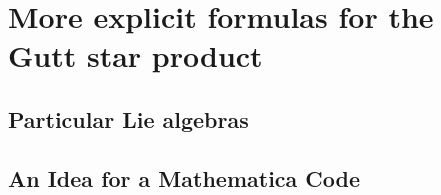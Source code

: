 
\chapter{More explicit formulas for the Gutt star product}

\section{Particular Lie algebras}
\label{sec:AppC_SpecialFormulas}

\section{An Idea for a Mathematica Code}
\label{sec:AppC_Mathematica}

